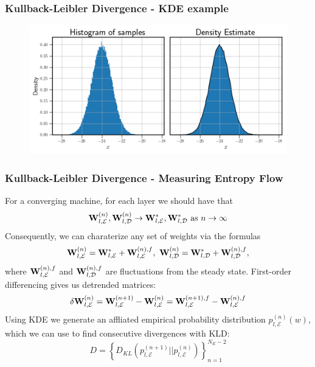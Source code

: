 \documentclass[11pt,aspectratio=169]{beamer}
\newcommand{\parens}[1]{\left(#1\right)}
\newcommand{\bracks}[1]{\left\{#1\right\}}
\begin{document}
    \begin{frame}
        \frametitle{Kullback-Leibler Divergence - KDE example}
        \begin{figure}
            \centering
            \includegraphics[width=\textwidth]{../Figures/kde_example.png}
        \end{figure}
    \end{frame}

    \begin{frame}
        \frametitle{Kullback-Leibler Divergence - Measuring Entropy Flow}
        For a converging machine, for each layer
        we should have that
        \begin{equation}
            {\bf W}_{l,\mathcal{E}}^{(n)}, {\bf W}_{l,\mathcal{D}}^{(n)} \to 
            {\bf W}_{l,\mathcal{E}}^{*}, {\bf W}_{l,\mathcal{D}}^{*} \text{ as }
            n \to \infty \label{eqn:weight convergence}
        \end{equation}
        Consequently, we can charaterize any set of weights via the formulas
        \begin{equation}
            {\bf W}_{l,\mathcal{E}}^{(n)} = {\bf W}_{l,\mathcal{E}}^{*} + {\bf W}_{l,\mathcal{E}}^{(n),f},\
            {\bf W}_{l,\mathcal{D}}^{(n)} = {\bf W}_{l,\mathcal{D}}^{*} + {\bf W}_{l,\mathcal{D}}^{(n),f},
        \end{equation}
        where ${\bf W}_{l,\mathcal{E}}^{(n),f}$ and 
        ${\bf W}_{l,\mathcal{D}}^{(n),f}$ are fluctuations from the 
        steady state. First-order differencing gives us detrended matrices:
        \begin{equation}
            \delta{\bf W}_{l,\mathcal{E}}^{(n)} = {\bf W}_{l,\mathcal{E}}^{(n+1)} - {\bf W}_{l,\mathcal{E}}^{(n)}
            = {\bf W}_{l,\mathcal{E}}^{(n+1),f} - {\bf W}_{l,\mathcal{E}}^{(n),f}
        \end{equation}
        Using KDE we generate an affliated empirical probability 
        distribution $p_{l,\mathcal{E}}^{(n)}(w)$, which we can use to find consecutive divergences with KLD:
        \begin{equation}
            D = \bracks{D_{KL}\parens{p_{l,\mathcal{E}}^{(n+1)} \Big|\!\Big| p_{l,\mathcal{E}}^{(n)}}}_{n=1}^{N_E - 2}
        \end{equation}
    \end{frame}
\end{document}
